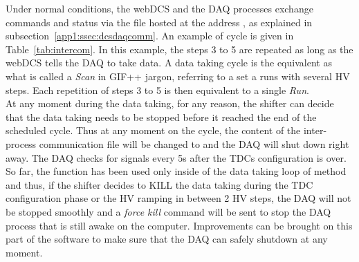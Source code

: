     Under normal conditions, the webDCS and the DAQ processes exchange commands and status via the file hosted at the address , as explained in subsection~\ref{app1:ssec:dcsdaqcomm}. An example of cycle is given in Table~\ref{tab:intercom}. In this example, the steps 3 to 5 are repeated as long as the webDCS tells the DAQ to take data. A data taking cycle is the equivalent as what is called a \textit{Scan} in GIF++ jargon, referring to a set a runs with several HV steps. Each repetition of steps 3 to 5 is then equivalent to a single \textit{Run}.\\
    
    At any moment during the data taking, for any reason, the shifter can decide that the data taking needs to be stopped before it reached the end of the scheduled cycle. Thus at any moment on the cycle, the content of the inter-process communication file will be changed to  and the DAQ will shut down right away. The DAQ checks for  signals every 5s after the TDCs configuration is over. So far, the function  has been used only inside of the data taking loop of method  and thus, if the shifter decides to KILL the data taking during the TDC configuration phase or the HV ramping in between 2 HV steps, the DAQ will not be stopped smoothly and a \textit{force kill} command will be sent to stop the DAQ process that is still awake on the computer. Improvements can be brought on this part of the software to make sure that the DAQ can safely shutdown at any moment.\\
    
